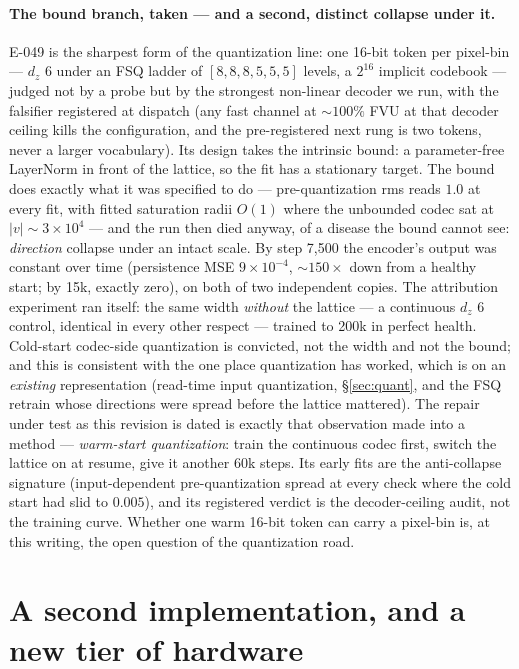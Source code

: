 \documentclass[10pt]{article}
\begin{document}
\paragraph{The bound branch, taken --- and a second, distinct collapse
under it.} E-049 is the sharpest form of the quantization line: one
16-bit token per pixel-bin --- $d_z$ 6 under an FSQ ladder of
$[8,8,8,5,5,5]$ levels, a $2^{16}$ implicit codebook --- judged not by a
probe but by the strongest non-linear decoder we run, with the falsifier
registered at dispatch (any fast channel at ${\sim}100\%$ FVU at that
decoder ceiling kills the configuration, and the pre-registered next rung
is two tokens, never a larger vocabulary). Its design takes the intrinsic
bound: a parameter-free LayerNorm in front of the lattice, so the fit has
a stationary target. The bound does exactly what it was specified to do
--- pre-quantization rms reads $1.0$ at every fit, with fitted saturation
radii $O(1)$ where the unbounded codec sat at $|v|\sim3\times10^4$ ---
and the run then died anyway, of a disease the bound cannot see:
\emph{direction} collapse under an intact scale. By step 7{,}500 the
encoder's output was constant over time (persistence MSE $9\times10^{-4}$,
${\sim}150\times$ down from a healthy start; by 15k, exactly zero), on
both of two independent copies. The attribution experiment ran itself:
the same width \emph{without} the lattice --- a continuous $d_z$ 6
control, identical in every other respect --- trained to 200k in perfect
health. Cold-start codec-side quantization is convicted, not the width
and not the bound; and this is consistent with the one place quantization
has worked, which is on an \emph{existing} representation (read-time
input quantization, \S\ref{sec:quant}, and the FSQ retrain whose
directions were spread before the lattice mattered). The repair under
test as this revision is dated is exactly that observation made into a
method --- \emph{warm-start quantization}: train the continuous codec
first, switch the lattice on at resume, give it another 60k steps. Its
early fits are the anti-collapse signature (input-dependent
pre-quantization spread at every check where the cold start had slid to
$0.005$), and its registered verdict is the decoder-ceiling audit, not
the training curve. Whether one warm 16-bit token can carry a pixel-bin
is, at this writing, the open question of the quantization road.

\section{A second implementation, and a new tier of
hardware}\label{sec:jax}
\end{document}
